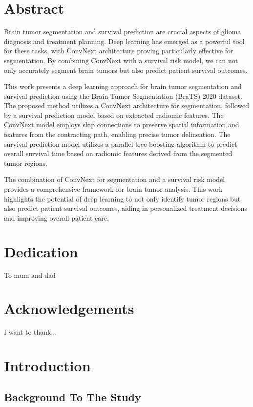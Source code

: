 \documentclass[12pt,oneside]{report}
\begin{document}
\chapter*{Abstract}
Brain tumor segmentation and survival prediction are crucial aspects of glioma diagnosis and treatment planning. Deep learning has emerged as a powerful tool for these tasks, with ConvNext architecture proving particularly effective for segmentation. By combining ConvNext with a survival risk model, we can not only accurately segment brain tumors but also predict patient survival outcomes.

This work presents a deep learning approach for brain tumor segmentation and survival prediction using the Brain Tumor Segmentation (BraTS) 2020 dataset. The proposed method utilizes a ConvNext architecture for segmentation, followed by a survival prediction model based on extracted radiomic features. The ConvNext model employs skip connections to preserve spatial information and features from the contracting path, enabling precise tumor delineation. The survival prediction model utilizes a parallel tree boosting algorithm to predict overall survival time based on radiomic features derived from the segmented tumor regions.

The combination of ConvNext for segmentation and a survival risk model provides a comprehensive framework for brain tumor analysis. This work highlights the potential of deep learning to not only identify tumor regions but also predict patient survival outcomes, aiding in personalized treatment decisions and improving overall patient care.

\chapter*{Dedication}
To mum and dad



\chapter*{Acknowledgements}
I want to thank...

\tableofcontents

\chapter{Introduction}

\section{Background To The Study}
\end{document}
